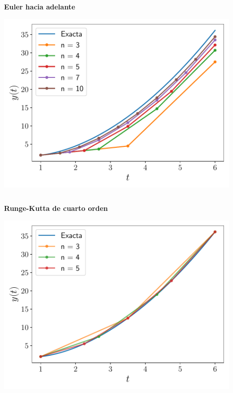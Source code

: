 \documentclass[9pt, aspectratio=169]{beamer}
\begin{document}
\begin{frame}[fragile]
\begin{columns}

\begin{center}
    \textbf{Euler hacia adelante}

    \includegraphics[width=0.9\textwidth]{code/euler.pdf}
\end{center}
\end{columns}
\end{frame}

\begin{frame}[fragile]
\begin{columns}

\begin{center}
    \textbf{Runge-Kutta de cuarto orden}

    \includegraphics[width=0.9\textwidth]{code/rk4.pdf}
\end{center}
\end{columns}
\end{frame}
\end{document}
